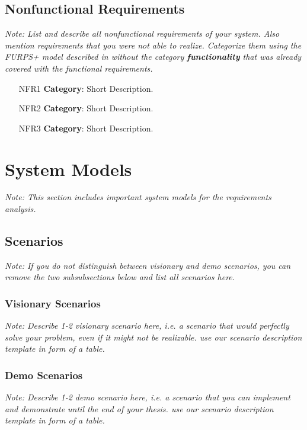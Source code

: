 \documentclass[a4paper,12pt,twoside]{report}
\begin{document}
\subsection{Nonfunctional Requirements}

\textit{Note: List and describe all nonfunctional requirements of your system. Also mention requirements that you were not able to realize. Categorize them using the FURPS+ model described in \cite{bruegge2004object} without the category \textbf{functionality} that was already covered with the functional requirements.}

\begin{itemize}
\item [NFR1] \textbf{Category}: Short Description.
\item [NFR2] \textbf{Category}: Short Description.
\item [NFR3] \textbf{Category}: Short Description.
\end{itemize}

\section{System Models}

\textit{Note: This section includes important system models for the requirements analysis.}

\subsection{Scenarios}

\textit{Note: If you do not distinguish between visionary and demo scenarios, you can remove the two subsubsections below and list all scenarios here.}

\subsubsection{Visionary Scenarios}

\textit{Note: Describe 1-2 visionary scenario here, i.e. a scenario that would perfectly solve your problem, even if it might not be realizable. use our scenario description template in form of a table.}

\subsubsection{Demo Scenarios}

\textit{Note: Describe 1-2 demo scenario here, i.e. a scenario that you can implement and demonstrate until the end of your thesis. use our scenario description template in form of a table.}
\end{document}
